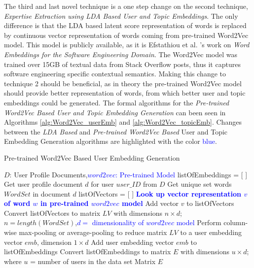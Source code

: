             The third and last novel technique is a one step change on the second technique, \emph{Expertise Extraction using LDA Based User and Topic Embeddings}. The only difference is that the LDA based latent score representation of words is replaced by continuous vector representation of words coming from pre-trained Word2Vec model. This model is publicly available, as it is Efstathiou et al. \cite{efstathiou2018word}'s work on \emph{Word Embeddings for the Software Engineering Domain}. The Word2Vec model \cite{mikolov2013efficient} was trained over 15GB of textual data from Stack Overflow posts, thus it captures software engineering specific contextual semantics. Making this change to technique 2 should be beneficial, as in theory the pre-trained Word2Vec model should provide better representation of words, from which better user and topic embeddings could be generated. The formal algorithms for the \emph{Pre-trained Word2Vec Based User and Topic Embedding Generation} can been seen in Algorithms \ref{alg:Word2Vec_userEmb} and \ref{alg:Word2Vec_topicEmb}. Changes between the \emph{LDA Based} and \emph{Pre-trained Word2Vec Based} User and Topic Embedding Generation algorithms are highlighted with the color \textcolor{blue}{blue}. 
        
            \begin{algorithm}
            \caption{Pre-trained Word2Vec Based User Embedding Generation}
            \label{alg:Word2Vec_userEmb}
            \begin{algorithmic}[1]
                \REQUIRE $D$: User Profile Documents,\textcolor{blue}{$word2vec$: Pre-trained Model}
                \STATE listOfEmbeddings = [ ]
                    \STATE Get user profile document $d$ for user $user\_ID$ from $D$
                    \STATE Get unique set words $WordSet$ in document $d$
                    \STATE listOfVectors = [ ]
                    \STATE
                        \STATE \textbf{\textcolor{blue}{Look up vector representation $v$ of word $w$ in pre-trained $word2vec$ model}}
                        \STATE Add vector $v$ to listOfVectors
                    \ENDFOR
                    \STATE Convert listOfVectors to matrix $LV$ with dimensions $n \times d$; $n=length(WordSet)$,\textcolor{blue}{$d=$ dimensionality of $word2vec$ model}
                    \STATE Perform column-wise max-pooling or average-pooling to reduce matrix $LV$ to a user embedding vector $emb$, dimension $1 \times d$
                    \STATE Add user embedding vector $emb$ to listOfEmbeddings
                \ENDFOR
                \STATE Convert listOfEmbeddings to matrix $E$ with dimensions $u \times d$; where $u$ = number of users in the data set
                \RETURN Matrix $E$
            \end{algorithmic}
            \end{algorithm}
            
